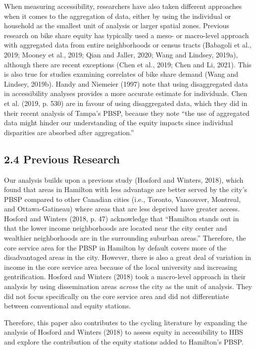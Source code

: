 \documentclass[]{elsarticle} %
\begin{document}
When measuring accessibility, researchers have also taken different
approaches when it comes to the aggregation of data, either by using the
individual or household as the smallest unit of analysis or larger
spatial zones. Previous research on bike share equity has typically used
a meso- or macro-level approach with aggregated data from entire
neighborhoods or census tracts (Babagoli et al., 2019; Mooney et al.,
2019; Qian and Jaller, 2020; Wang and Lindsey, 2019a), although there
are recent exceptions (Chen et al., 2019; Chen and Li, 2021). This is
also true for studies examining correlates of bike share demand (Wang
and Lindsey, 2019b). Handy and Niemeier (1997) note that using
disaggregated data in accessibility analyses provides a more accurate
estimate for individuals. Chen et al. (2019, p. 530) are in favour of
using disaggregated data, which they did in their recent analysis of
Tampa's PBSP, because they note ``the use of aggregated data might
hinder our understanding of the equity impacts since individual
disparities are absorbed after aggregation.''

\hypertarget{previous-research}{%
\subsection{2.4 Previous Research}\label{previous-research}}

Our analysis builds upon a previous study (Hosford and Winters, 2018),
which found that areas in Hamilton with less advantage are better served
by the city's PBSP compared to other Canadian cities (i.e., Toronto,
Vancouver, Montreal, and Ottawa-Gatineau) where areas that are less
deprived have greater access. Hosford and Winters (2018, p. 47)
acknowledge that ``Hamilton stands out in that the lower income
neighborhoods are located near the city center and wealthier
neighborhoods are in the surrounding suburban areas.'' Therefore, the
core service area for the PBSP in Hamilton by default covers more of the
disadvantaged areas in the city. However, there is also a great deal of
variation in income in the core service area because of the local
university and increasing gentrification. Hosford and Winters (2018)
took a macro-level approach in their analysis by using dissemination
areas \emph{across} the city as the unit of analysis. They did not focus
specifically on the core service area and did not differentiate between
conventional and equity stations.

Therefore, this paper also contributes to the cycling literature by
expanding the analysis of Hosford and Winters (2018) to assess equity in
accessibility to HBS and explore the contribution of the equity stations
added to Hamilton's PBSP.
\end{document}

